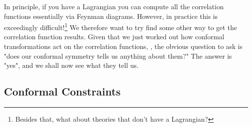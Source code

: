In principle, if you have a Lagrangian you can compute all the correlation functions essentially via Feynman diagrams. However, in practice this is exceedingly difficult!\footnote{Besides that, what about theories that don't have a Lagrangian?} We therefore want to try find some other way to get the correlation function results. Given that we just worked out how conformal transformations act on the correlation functions, , the obvious question to ask is "does our conformal symmetry tells us anything about them?" The answer is "yes", and we shall now see what they tell us. 

\subsection{Conformal Constraints}



